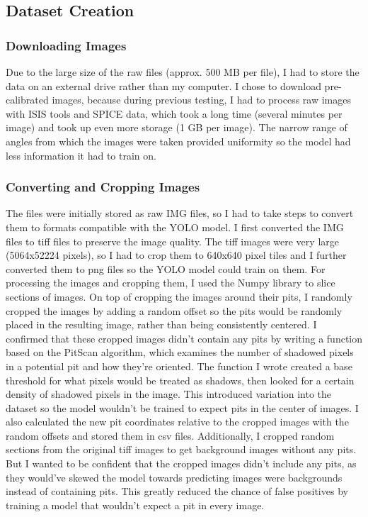 \documentclass[twoside,10pt]{article}
\begin{document}
\subsection{Dataset Creation}
\fontsize{12}{14}\selectfont

\subsubsection{Downloading Images}
Due to the large size of the raw files (approx. 500 MB per file), I had to store the data on an external drive rather than my computer. I chose to download pre-calibrated images, because during previous testing, I had to process raw images with ISIS tools and SPICE data, which took a long time (several minutes per image) and took up even more storage (1 GB per image). The narrow range of angles from which the images were taken provided uniformity so the model had less information it had to train on.

\subsubsection{Converting and Cropping Images}
The files were initially stored as raw IMG files, so I had to take steps to convert them to formats compatible with the YOLO model. I first converted the IMG files to tiff files to preserve the image quality. The tiff images were very large (5064x52224 pixels), so I had to crop them to 640x640 pixel tiles and I further converted them to png files so the YOLO model could train on them. For processing the images and cropping them, I used the Numpy \cite{2020NumPy-Array} library to slice sections of images. On top of cropping the images around their pits, I randomly cropped the images by adding a random offset so the pits would be randomly placed in the resulting image, rather than being consistently centered. I confirmed that these cropped images didn't contain any pits by writing a function based on the PitScan \cite{wagner2018pitscan} algorithm, which examines the number of shadowed pixels in a potential pit and how they're oriented. The function I wrote created a base threshold for what pixels would be treated as shadows, then looked for a certain density of shadowed pixels in the image. This introduced variation into the dataset so the model wouldn't be trained to expect pits in the center of images. I also calculated the new pit coordinates relative to the cropped images with the random offsets and stored them in csv files. Additionally, I cropped random sections from the original tiff images to get background images without any pits. But I wanted to be confident that the cropped images didn't include any pits, as they would've skewed the model towards predicting images were backgrounds instead of containing pits. This greatly reduced the chance of false positives by training a model that wouldn't expect a pit in every image.
\end{document}
